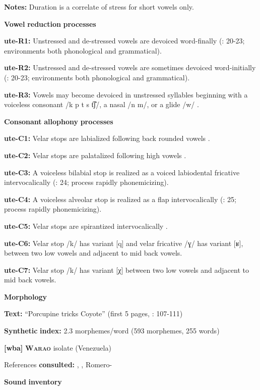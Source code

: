 \begin{styleBody}
\textbf{Notes:} Duration is a correlate of stress for short vowels only.

\textbf{Vowel} \textbf{reduction} \textbf{processes}

\textbf{ute-R1:} Unstressed and de-stressed vowels are devoiced word-finally (\citealt{Givón2011}: 20-23; environments both phonological and grammatical).

\textbf{ute-R2:} Unstressed and de-stressed vowels are sometimes devoiced word-initially (\citealt{Givón2011}: 20-23; environments both phonological and grammatical).

\textbf{ute-R3:} Vowels may become devoiced in unstressed syllables beginning with a voiceless consonant /k p t s t͡ʃ/, a nasal /n m/, or a glide /w/ \citep[21]{Givón2011}.

\textbf{Consonant} \textbf{allophony} \textbf{processes}

\textbf{ute-C1:} Velar stops are labialized following back rounded vowels \citep[29]{Givón2011}.

\textbf{ute-C2:} Velar stops are palatalized following high vowels \citep[29]{Givón2011}.

\textbf{ute-C3:} A voiceless bilabial stop is realized as a voiced labiodental fricative intervocalically (\citealt{Givón2011}: 24; process rapidly phonemicizing).

\textbf{ute-C4:} A voiceless alveolar stop is realized as a flap intervocalically (\citealt{Givón2011}: 25; process rapidly phonemicizing).

\textbf{ute-C5:} Velar stops are spirantized intervocalically \citep[26-7]{Givón2011}.

\textbf{ute-C6:} Velar stop /k/ has variant [q] and velar fricative /ɣ/ has variant [ʁ], between two low vowels and adjacent to mid back vowels.

\textbf{ute-C7:} Velar stop /k/ has variant [χ] between two low vowels and adjacent to mid back vowels.

\textbf{Morphology}

\textbf{Text:} “Porcupine tricks Coyote” (first 5 pages, \citealt{Givón2013}: 107-111)

\textbf{Synthetic} \textbf{index:} 2.3 morphemes/word (593 morphemes, 255 words)

\textbf{[wba]} \textbf{\textsc{Warao}}  isolate (Venezuela)

References \textbf{consulted:} \citet{Arinterol2000}, \citet{Osborn1966}, Romero-\citet{Figeroa1997}

\textbf{Sound} \textbf{inventory}


\end{styleBody}
